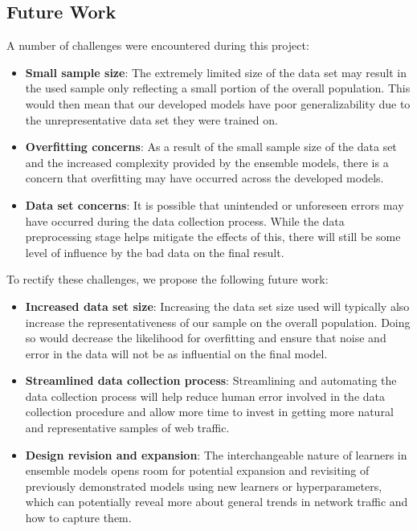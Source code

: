 \documentclass[10pt,sigconf,letterpaper,nonacm]{acmart}
\begin{document}
\subsection{Future Work}

A number of challenges were encountered during this project:

\begin{itemize}
  \item \textbf{Small sample size}: The extremely limited size of the data set may result in the used sample only reflecting a small portion of the overall population.
  This would then mean that our developed models have poor generalizability due to the unrepresentative data set they were trained on.
  
  \item \textbf{Overfitting concerns}: As a result of the small sample size of the data set and the increased complexity provided by the ensemble models, there is a concern that overfitting may have occurred across the developed models. 
  
  \item \textbf{Data set concerns}: It is possible that unintended or unforeseen errors may have occurred during the data collection process.
  While the data preprocessing stage helps mitigate the effects of this, there will still be some level of influence by the bad data on the final result.
\end{itemize}

To rectify these challenges, we propose the following future work:

\begin{itemize}
  \item \textbf{Increased data set size}: Increasing the data set size used will typically also increase the representativeness of our sample on the overall population.
  Doing so would decrease the likelihood for overfitting and ensure that noise and error in the data will not be as influential on the final model.
  
  \item \textbf{Streamlined data collection process}: Streamlining and automating the data collection process will help reduce human error involved in the data collection procedure and allow more time to invest in getting more natural and representative samples of web traffic.
  
  \item \textbf{Design revision and expansion}: The interchangeable nature of learners in ensemble models opens room for potential expansion and revisiting of previously demonstrated models using new learners or hyperparameters, which can potentially reveal more about general trends in network traffic and how to capture them.
\end{itemize}
\end{document}
